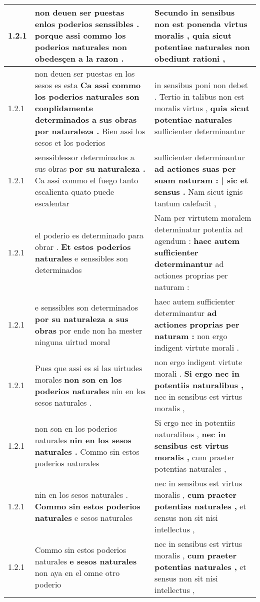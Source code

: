 \begin{tabular}{|p{1cm}|p{6.5cm}|p{6.5cm}|}
1.2.1 & non deuen ser puestas enlos poderios senssibles . \textbf{ porque assi commo los poderios naturales } non obedesçen a la razon . & Secundo in sensibus non est ponenda virtus moralis , \textbf{ quia sicut potentiae naturales } non obediunt rationi , \\\hline
1.2.1 & non deuen ser puestas en los sesos es esta \textbf{ Ca assi commo los poderios naturales son conplidamente determinados a sus obras por naturaleza . } Bien assi los sesos et los poderios & in sensibus poni non debet . Tertio in talibus non est moralis virtus , \textbf{ quia sicut potentiae naturales } sufficienter determinantur \\\hline
1.2.1 & senssiblessor determinados a sus oƀras \textbf{ por su naturaleza . } Ca assi commo el fuego tanto escalienta quato puede escalentar & sufficienter determinantur \textbf{ ad actiones suas per suam naturam : | sic et sensus . } Nam sicut ignis tantum calefacit , \\\hline
1.2.1 & el poderio es determinado para obrar . \textbf{ Et estos poderios naturales } e senssibles son determinados & Nam per virtutem moralem determinatur potentia ad agendum : \textbf{ haec autem sufficienter determinantur } ad actiones proprias per naturam : \\\hline
1.2.1 & e senssibles son determinados \textbf{ por su naturaleza a sus obras } por ende non ha mester ninguna uirtud moral & haec autem sufficienter determinantur \textbf{ ad actiones proprias per naturam : } non ergo indigent virtute morali . \\\hline
1.2.1 & Pues que assi es si las uirtudes morales \textbf{ non son en los poderios naturales } nin en los sesos naturales . & non ergo indigent virtute morali . \textbf{ Si ergo nec in potentiis naturalibus , } nec in sensibus est virtus moralis , \\\hline
1.2.1 & non son en los poderios naturales \textbf{ nin en los sesos naturales . } Commo sin estos poderios naturales & Si ergo nec in potentiis naturalibus , \textbf{ nec in sensibus est virtus moralis , } cum praeter potentias naturales , \\\hline
1.2.1 & nin en los sesos naturales . \textbf{ Commo sin estos poderios naturales } e sesos naturales & nec in sensibus est virtus moralis , \textbf{ cum praeter potentias naturales , } et sensus non sit nisi intellectus , \\\hline
1.2.1 & Commo sin estos poderios naturales \textbf{ e sesos naturales } non aya en el omne otro poderio & nec in sensibus est virtus moralis , \textbf{ cum praeter potentias naturales , } et sensus non sit nisi intellectus , \\\hline

\end{tabular}
